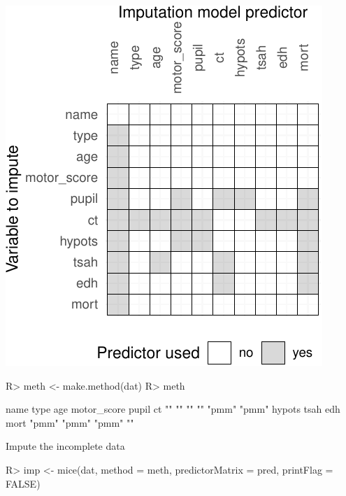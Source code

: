 \documentclass[
]{jss}
\begin{document}
\begin{CodeChunk}
\begin{center}\includegraphics{Imputation_of_Incomplete_Multilevel_Data_files/figure-latex/impact-2} \end{center}

\begin{CodeInput}
R> meth <- make.method(dat)
R> meth
\end{CodeInput}
\begin{CodeOutput}
       name        type         age motor_score       pupil          ct 
         ""          ""          ""          ""       "pmm"       "pmm" 
     hypots        tsah         edh        mort 
      "pmm"       "pmm"       "pmm"          "" 
\end{CodeOutput}
\end{CodeChunk}

Impute the incomplete data

\begin{CodeChunk}
\begin{CodeInput}
R> imp <- mice(dat, method = meth, predictorMatrix = pred, printFlag = FALSE)
\end{CodeInput}
\end{CodeChunk}
\end{document}
